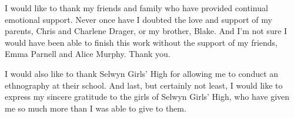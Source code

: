 \begin{refsection}
I would like to thank my friends and family who have provided continual emotional support.  Never once have I doubted the love and support of my parents, Chris and Charlene Drager, or my brother, Blake.  And I'm not sure I would have been able to finish this work without the support of my friends, Emma Parnell and Alice Murphy.  Thank you. 

I would also like to thank Selwyn Girls' High for allowing me to conduct an ethnography at their school.  And last, but certainly not least, I would like to express my sincere gratitude to the girls of Selwyn Girls' High, who have given me so much more than I was able to give to them.

\printbibliography[heading=subbibliography]
\end{refsection}